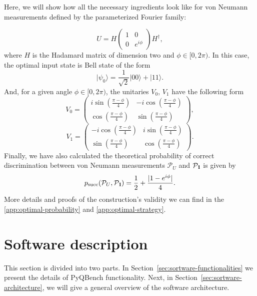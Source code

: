 \documentclass[preprint,12pt, a4paper, dvipsnames]{elsarticle}
\newcommand{\ket}[1]{\ensuremath{|#1\rangle}}
\newcommand{\1}{{\rm 1\hspace{-0.9mm}l}}
\newcommand{\Id}{{\rm 1\hspace{-0.9mm}l}}
\newcommand{\PP}{\mathcal{P}}
\begin{document}
Here,  we will show how all the necessary ingredients look like for
von Neumann measurements defined by the parameterized Fourier family:

\begin{equation}
U = H
\left(\begin{array}{cc}1&0\\0&e^{i \phi}\end{array}\right)  H^\dagger,
\end{equation}
where $H$ is the Hadamard matrix of dimension two and $\phi \in [0, 2 \pi)$.
In this case, the optimal input state is Bell state of the form
\begin{equation}
\ket{\psi_{0}} = \frac{1}{\sqrt{2}} \ket{00} + \ket{11}.
\end{equation}
And, for a given angle  $\phi \in  [0, 2 \pi)$,   the unitaries $V_0$,  $V_1$
have the following form
\begin{equation}
V_0 = \left(\begin{array}{cc}i \sin\left( \frac{\pi - \phi}{4} \right)&-i
\cos\left( \frac{\pi - \phi}{4} \right)\\ \cos\left( \frac{\pi -
	\phi}{4}\right)& \sin\left( \frac{\pi - \phi}{4} \right)\end{array}\right),
\end{equation}
\begin{equation}
V_1 = \left(\begin{array}{cc}-i \cos\left(\frac{\pi - \phi}{4}\right) &i
\sin\left( \frac{\pi - \phi}{4}\right)\\\sin\left( \frac{\pi - \phi}{4} \right)
&  \cos\left( \frac{\pi - \phi}{4} \right) \end{array}\right).
\end{equation}
Finally, we have also calculated the theoretical probability of correct discrimination between von Neumann
measurements $\PP_U$ and $\PP_{\Id}$ is given by
\begin{equation}
p_{\text{succ}}(\PP_{U}, \PP_{\Id}) = \frac{1}{2} + \frac{|1 - e^{i \phi}  |}{4} .
\end{equation}
More details and proofs of the construction's validity   we can find in the \ref{app:optimal-probability} and \ref{app:optimal-strategy}.

 
 
 \section{Software description}
 \label{}
 This section is divided into two parts.
 In Section~\ref{sec:sortware-functionalities} we present the details of PyQBench functionality. Next, in Section~\ref{sec:sortware-architecture},
 we will give a general overview of the software architecture.
\end{document}
